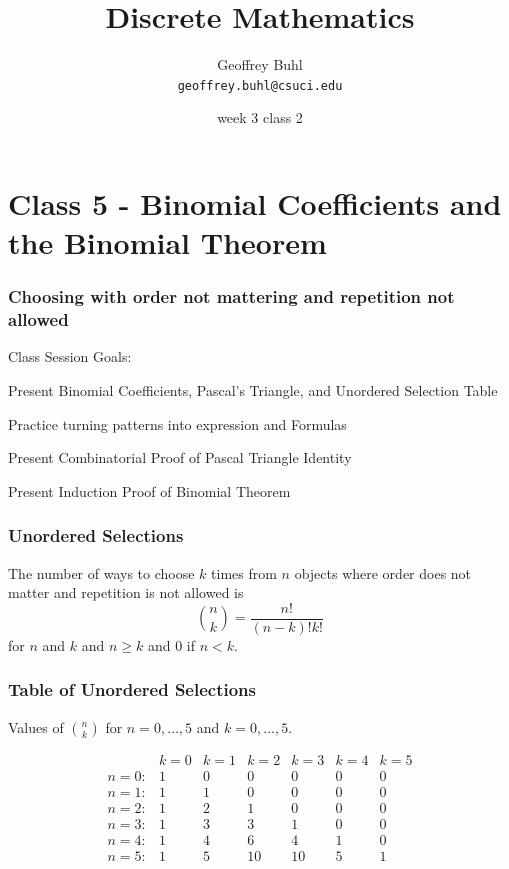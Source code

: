 \documentclass[xcolor=table]{beamer}
\title{Discrete Mathematics}
\author[Geoffrey Buhl]{Geoffrey Buhl \\ \texttt{geoffrey.buhl@csuci.edu}}
\institute[CSUCI]{California State University Channel Islands}
\date{week 3 class 2}
\newenvironment{packed_enum}{
\begin{enumerate}
  \setlength{\itemsep}{1pt}
  \setlength{\parskip}{0pt}
  \setlength{\parsep}{0pt}
}{\end{enumerate}}
\begin{document}


\section{Class 5 - Binomial Coefficients and the Binomial Theorem}


\frame
{
  \frametitle{Choosing with order not mattering and repetition not allowed}

Class Session Goals:
\begin{packed_enum}
\item Present Binomial Coefficients, Pascal's Triangle, and Unordered Selection Table
\item Practice turning patterns into expression and Formulas
\item Present Combinatorial Proof of Pascal Triangle Identity
\item Present Induction Proof of Binomial Theorem
\end{packed_enum}

}


\frame
{
  \frametitle{Unordered Selections}

The number of ways to choose $k$ times from $n$ objects where order does not matter and repetition is not allowed is  $$\binom{n}{k}=\frac{n!}{(n-k)!k!}$$ for $n$ and $k$ and $n \ge k$ and 0 if $n <k$.
\vfill


}

\frame
{
  \frametitle{Table of Unordered Selections}
Values of $\binom{n}{k}$ for $n=0,\ldots, 5$ and $k=0,\ldots, 5$.\vfill

$$
\begin{array}{rcccccc}
 & k=0 & k=1 & k=2 & k=3 & k=4 & k=5\\
n=0: &1 & 0 & 0 & 0 & 0& 0 \\
n=1:&1 & 1 & 0 & 0 & 0 & 0\\
n=2:&1 & 2 & 1 & 0 & 0 & 0\\
n=3:&1 & 3 & 3 & 1 & 0 & 0\\
n=4:&1 & 4 & 6 & 4 & 1 & 0\\
n=5: &1 & 5 & 10 & 10 & 5 & 1\\
\end{array}
$$
\vfill
}
\end{document}
